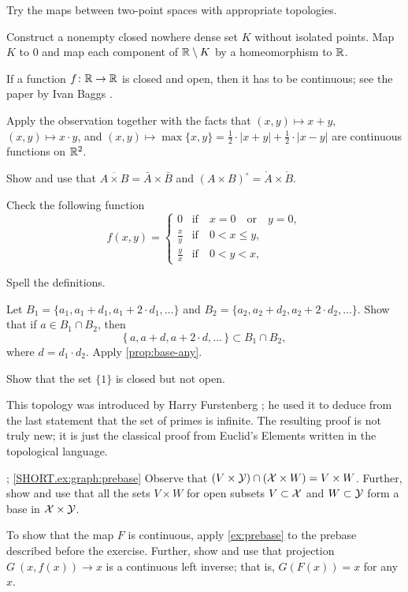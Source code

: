 Try the maps between two-point spaces with appropriate topologies.

Construct a nonempty closed nowhere dense set $K$ without isolated points.
Map $K$ to $0$ and map each component of $\mathbb{R}\setminus K$ by a homeomorphism to $\mathbb{R}$.

If a function $f\colon\mathbb{R}\to \mathbb{R}$ is closed and open, then it has to be continuous;
see the paper by Ivan Baggs \cite{baggs}.

Apply the observation together with the facts that $(x,y)\mapsto x+y$, $(x,y)\mapsto x\cdot y$, and $(x,y)\mapsto \max\{x,y\}=\tfrac12\cdot |x+y|+\tfrac12\cdot |x-y|$ are continuous functions on $\mathbb{R}^2$.

Show and use that $\overline {A\times B}=\bar A\times \bar B$ and $(A\times B)^\circ=\mathring A\times \mathring B$.

Check the following function
\[f(x,y)=
\begin{cases}
0&\text{if}\quad x=0\quad\text{or}\quad y=0,
\\
\tfrac xy &\text{if}\quad 0<x\le y,
\\
\tfrac yx &\text{if}\quad 0<y< x,
\end{cases}
\]

 Spell the definitions.

Let $B_1=\{a_1,a_1+d_1,a_1+2\cdot d_1,\dots\}$ and $B_2=\{a_2,a_2+d_2,a_2+2\cdot d_2,\ldots\}$.
Show that if $a\in B_1\cap B_2$, then
\[\{\,a, a+d, a+2\cdot d,\ldots\,\}\subset B_1\cap B_2,\]
where $d=d_1\cdot d_2$.
Apply \ref{prop:base-any}.

Show that the set $\{1\}$ is closed but not open.

This topology was introduced by Harry Furstenberg \cite{furstenberg}; he used it to deduce from the last statement that the set of primes is infinite.
The resulting proof is not truly new; it is just the classical proof from Euclid's Elements written in the topological language.

\parbf{\ref{ex:graph}}; \ref{SHORT.ex:graph:prebase}
Observe that $(V\times \c{Y})\cap(\c{X}\times W) \z= V\times W$.
Further, show and use that all the sets $V\times W$ for open subsets $V\subset \mathcal{X}$ and $W\subset \mathcal{Y}$ form a base in $\mathcal{X}\times\mathcal{Y}$.

To show that the map $F$ is continuous,
apply \ref{ex:prebase} to the prebase described before the exercise.
Further, show and use that projection $G\:(x,f(x))\to x$ is a continuous left inverse;
that is, $G(F(x))=x$ for any $x$.

